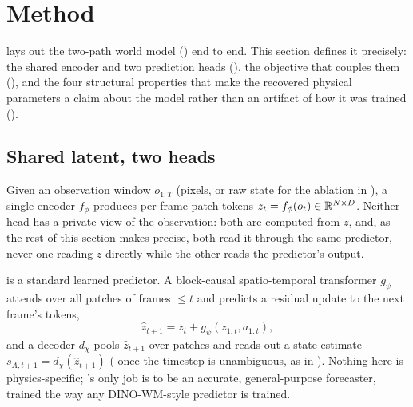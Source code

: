 \section{Method}
\label{sec:method}

 lays out the two-path world model
(\method) end to end. This section defines it precisely: the shared
encoder and two prediction heads (), the
objective that couples them (), and the four
structural properties that make the recovered physical parameters a
claim about the model rather than an artifact of how it was trained
().



\subsection{Shared latent, two heads}
\label{sec:method-forward}

Given an observation window $o_{1:T}$ (pixels, or raw state for the
ablation in ), a single encoder $f_\phi$
produces per-frame patch tokens $z_t = f_\phi(o_t) \in \mathbb{R}^{N \times
D}$. Neither head has a private view of the observation: both are
computed from $z$, and, as the rest of this section makes precise, both
read it through the same predictor, never one reading $z$ directly
while the other reads the predictor's output.

\pathA is a standard learned predictor. A block-causal
spatio-temporal transformer $g_\psi$ \citep{zhou2024dinowm} attends
over all patches of frames $\le t$ and predicts a residual update to
the next frame's tokens,
\begin{equation}
  \hat z_{t+1} = z_t + g_\psi(z_{1:t}, a_{1:t}),
\end{equation}
and a decoder $d_\chi$ pools $\hat z_{t+1}$ over patches and reads out
a state estimate $s_{A,t+1} = d_\chi(\hat z_{t+1})$ (\stateA{} once the
timestep is unambiguous, as in ). Nothing here
is physics-specific; \pathA's only job is to be an accurate,
general-purpose forecaster, trained the way any DINO-WM-style
predictor is trained.

